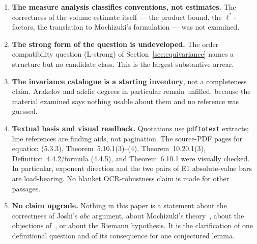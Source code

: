 \documentclass[11pt,a4paper]{article}
\theoremstyle{definition}
\theoremstyle{plain}
\theoremstyle{definition}
\begin{document}
\begin{enumerate}
  that $q_\ell$ in Theorem~6.10.1 is the
  \S\,4.4 $q$-divisor. The definition given immediately before the theorem
  supports that reading, but the identification is ours. The source PDF itself
  displays absolute-value bars on both sides of E1.
\item \textbf{The measure analysis classifies conventions, not estimates.} The
  correctness of the volume estimate itself --- the product bound, the
  $\ell^*$-factors, the translation to Mochizuki's formulation --- was not
  examined.
\item \textbf{The strong form of the question is undeveloped.} The order
  compatibility question (L-strong) of Section~\ref{sec:equivariance} names a
  structure but no candidate class. This is the largest substantive arrear.
\item \textbf{The invariance catalogue is a starting inventory}, not a
  completeness claim. Arakelov and adelic degrees in particular remain unfilled,
  because the material examined says nothing usable about them and no reference
  was guessed.
\item \textbf{Textual basis and visual readback.} Quotations use
  \texttt{pdftotext} extracts; line references are finding aids, not pagination.
  The source-PDF pages for equation (5.3.3), Theorem~5.10.1(3)--(4),
  Theorem~10.20.1(3), Definition~4.4.2/formula (4.4.5), and
  Theorem~6.10.1 were visually checked. In particular, exponent direction and the
  two pairs of E1 absolute-value bars are load-bearing. No blanket OCR-robustness
  claim is made for other passages.
\item \textbf{No claim upgrade.} Nothing in this paper is a statement about the
  correctness of Joshi's $abc$ argument, about Mochizuki's theory~\cite{Mochizuki2021a,Mochizuki2021b,Mochizuki2021c,Mochizuki2021d}, about the
  objections of~\cite{ScholzeStix2018}, or about the Riemann hypothesis. It is the
  clarification of one definitional question and of its consequence for one
  conjectured lemma.
\end{enumerate}

{}

\end{document}
